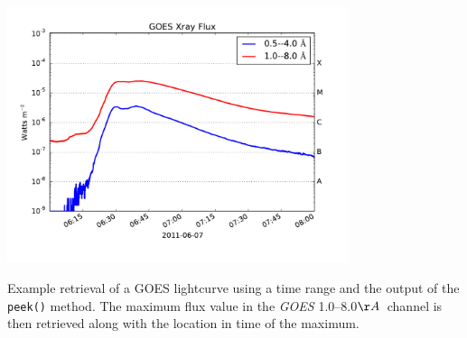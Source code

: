 \begin{listing}[H]
\begin{center}
\includegraphics[width=10cm]{goes_lightcurve.pdf}
\end{center}
\caption{Example retrieval of a GOES lightcurve
using a time range and the output of the 
\texttt{peek()} method. The maximum flux value in the \textit{GOES} 1.0--8.0$\AA$\ channel 
is then retrieved along with the location in time of the maximum.}
\label{code:goes_lc}
\end{listing}
